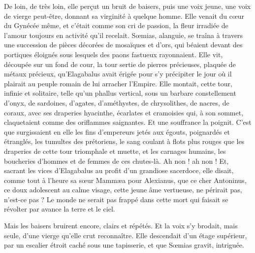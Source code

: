 \documentclass[a4paper, 11pt, oneside, polutonikogreek, french]{article}
\begin{document}
De loin, de très loin, elle perçut un bruit de baisers, puis une voix jeune, une voix de vierge peut-être, donnant sa virginité à quelque homme. Elle venait du cœur du Gynécée même, et c'était comme son cri de passion, la fleur irradiée de l'amour toujours en activité qu'il recelait. Sœmias, alanguie, se traîna à travers une succession de pièces décorées de mosaïques et d'ors, qui béaient devant des portiques éloignés sous lesquels des paons fastueux rayonnaient. Elle vit, découpée sur un fond de cour, la tour sertie de pierres précieuses, plaquée de métaux précieux, qu'Elagabalus avait érigée pour s'y précipiter le jour où il plairait au peuple romain de lui arracher l'Empire. Elle montait, cette tour, infinie et solitaire, telle qu'un phallus vertical, sous un barbare constellement d'onyx, de sardoines, d'agates, d'améthystes, de chrysolithes, de nacres, de coraux, avec ses draperies hyacinthe, écarlates et cramoisies qui, à son sommet, claquetaient comme des oriflammes saignantes. Et une souffrance la poignit. C'est que surgissaient en elle les fins d'empereurs jetés aux égouts, poignardés et étranglés, les tumultes des prétoriens, le sang coulant à flots plus rouges que les draperies de cette tour triomphale et muette, et les carnages humains, les boucheries d'hommes et de femmes de ces chutes-là. Ah non ! ah non ! Et, sacrant les vices d'Elagabalus au profit d'un grandiose sacerdoce, elle disait, comme tout à l'heure sa sœur Mammæa pour Alexianus, que ce cher Antoninus, ce doux adolescent au calme visage, cette jeune âme vertueuse, ne périrait pas, n'est-ce pas ? Le monde ne serait pas frappé dans cette mort qui faisait se révolter par avance la terre et le ciel.

Mais les baisers bruirent encore, clairs et répétés. Et la voix s'y brodait, mais seule, d'une vierge qu'elle crut reconnaître. Elle descendait d'un étage supérieur, par un escalier étroit caché sous une tapisserie, et que Sœmias gravit, intriguée.
\end{document}
